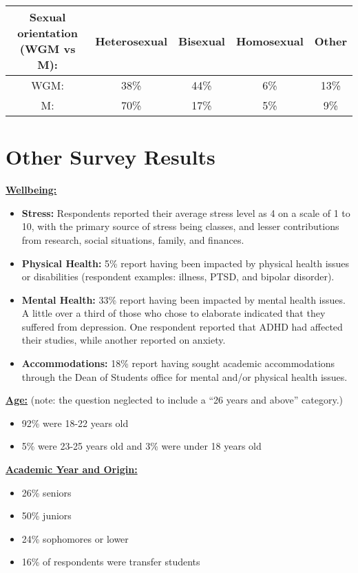 \documentclass[oneside]{book}   %
\begin{document}
\noindent\begin{tabular}{ccccc}
\textbf{Sexual orientation (WGM vs M):}  & Heterosexual & Bisexual & Homosexual & Other \\
\hline
WGM: & 38\% & 44\% & 6\% & 13\% \\
M:  & 70\% & 17\% & 5\% & 9\% \\
\hline
\end{tabular}

\section{Other Survey Results}
\noindent\underline{\textbf{Wellbeing:}}
\begin{itemize}
	\item \textbf{Stress:} Respondents reported their average stress level as 4 on a scale of 1 to 10, with the primary source of stress being classes, and lesser contributions from research, social situations, family, and finances.
	\item \textbf{Physical Health:} 5\% report having been impacted by physical health issues or disabilities (respondent examples: illness, PTSD, and bipolar disorder).
	\item \textbf{Mental Health:} 33\% report having been impacted by mental health issues. A little over a third of those who chose to elaborate indicated that they suffered from depression. One respondent reported that ADHD had affected their studies, while another reported on anxiety.
	\item \textbf{Accommodations:} 18\% report having sought academic accommodations through the Dean of Students office for mental and/or physical health issues.
\end{itemize}

\noindent\underline{\textbf{Age:}} (note: the question neglected to include a “26 years and above” category.)
\begin{itemize}
	\item 92\% were 18-22 years old
	\item 5\% were 23-25 years old and 3\% were under 18 years old
\end{itemize}

\noindent\underline{\textbf{Academic Year and Origin:}}
\begin{itemize}
	\item 26\% seniors
	\item 50\% juniors
	\item 24\% sophomores or lower
	\item 16\% of respondents were transfer students
\end{itemize}
\end{document}

